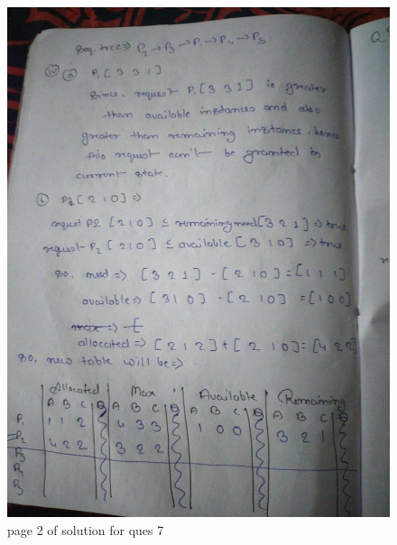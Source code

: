 \documentclass[11pt,a4paper,oneside]{article}
\begin{document}
\begin{figure}[hbt!]
	\centering
	\includegraphics[width=1.5\textwidth, angle=-90]{images/red_images/q7i2.jpg}
	\caption{page 2 of solution for ques 7}
\end{figure}
\end{document}

